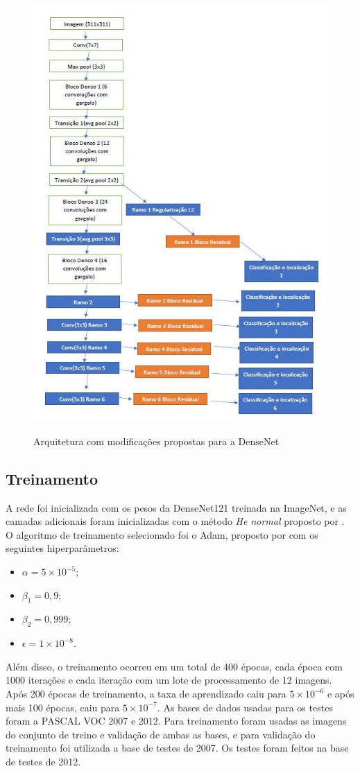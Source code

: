 \begin{figure}[t]
	\setlength{\abovecaptionskip}{0pt}
	\setlength{\belowcaptionskip}{0pt}
	\caption[Arquitetura proposta]{Arquitetura com modificações propostas para a \ac{DenseNet}}
	\centering
	\includegraphics[width=.6\textwidth]{imagem/0x_densenet_classloc.jpg}
	\captionsetup{justification=centering}
	\label{fig:dense_ssd}
\end{figure}


\subsection{Treinamento}
\label{secao:4:3:2}

A rede foi inicializada com os pesos da \ac{DenseNet}121 treinada na ImageNet, e as camadas adicionais foram inicializadas com o método \textit{He normal} proposto por . O algoritmo de treinamento selecionado foi o Adam, proposto por  com os seguintes hiperparâmetros:

\begin{itemize}
	\item $\alpha = 5\times10^{-5}$;
	\item $\beta_1 = 0,9$;
	\item $\beta_2 = 0,999$;
	\item $\epsilon = 1\times10^{-8}$.
\end{itemize}

Além disso, o treinamento ocorreu em um total de 400 épocas, cada época com 1000 iterações e cada iteração com um lote de processamento de 12 imagens. Após 200 épocas de treinamento, a taxa de aprendizado caiu para $5\times10^{-6}$ e após mais 100 épocas, caiu para $5\times10^{-7}$. As bases de dados usadas para os testes foram a \ac{PASCAL VOC} 2007 e 2012. Para treinamento foram usadas as imagens do conjunto de treino e validação de ambas as bases, e para validação do treinamento foi utilizada a base de testes de 2007. Os testes foram feitos na base de testes de 2012.
